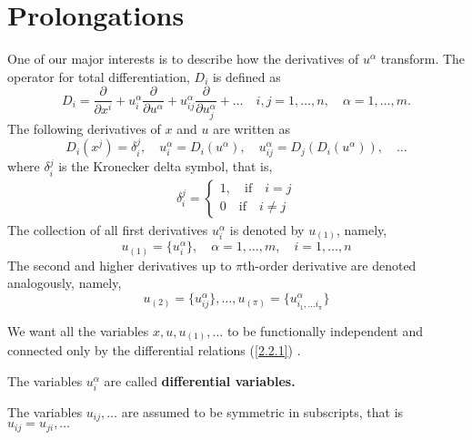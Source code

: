 \section{Prolongations}
One of our major interests is to  describe how the derivatives of $u^{\alpha}$ transform. The  operator for total differentiation, $D_i$ is defined as
\begin{equation}
D_i = \frac{ \partial }{ \partial x^i} + u_{i}^{\alpha } \frac{ \partial }{ \partial u^{\alpha }} + u_{ij}^{\alpha } \frac{ \partial }{ \partial u_{j}^{\alpha }}+ \ldots \quad i,j = 1, \ldots, n, \quad \alpha=1, \ldots, m. \label{2.2.2}
\end{equation}
The following derivatives of $x$ and $u$ are written as \begin{equation} \label{2.2.1} D_i(x^j)= \delta_i^j,\quad 
u_{i}^{\alpha}= D_i( u^{\alpha}), \quad u_{ij}^{\alpha}= D_{j}(D_{i}( u^{\alpha})), \quad \ldots 
\end{equation} where $ \delta_i^j$ is the Kronecker delta symbol, that is,
\begin{align}
	\delta_i^j = \begin{cases} 1,\quad  \text{if} \quad i=j\\ 0 \quad \text{if} \quad i \neq j
	\end{cases}
\end{align}
The collection of all first derivatives $ u_i^{\alpha}$ is denoted by $ u_{(1)} $, namely, \begin{equation}
u_{(1)} = \{ u_i^{\alpha}  \}, \quad \alpha = 1, \ldots, m, \quad i =1, \ldots, n
\end{equation}
The second and higher derivatives  up to $ \pi$th-order derivative are denoted analogously, namely, \begin{equation}
 u_{(2)}=  \{ u_{ij}^{\alpha}  \}, \ldots, u_{(\pi)} = \{ u_{i_1, \ldots i_\pi}^{\alpha}  \}
\end{equation}


\begin{rem}
We want all the variables $ x, u , u_{(1)}, \ldots $ to be functionally independent and connected only by the differential  relations (\ref{2.2.1})  \citep{ibragimov1999elementary}.

The  variables $u^{\alpha}_{i} $ are called \textbf{differential variables.}

The variables  $ u_{ij}, \ldots $ are assumed to be symmetric in subscripts, that is $u_{ij} = u_{ji}, \ldots$
\end{rem}
